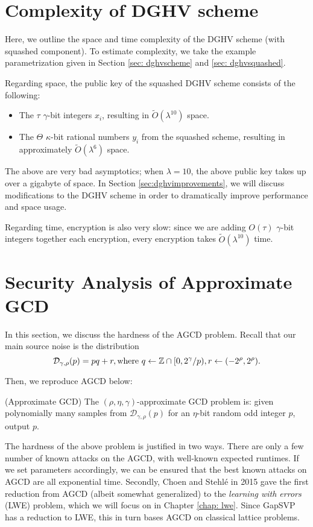 \section{Complexity of DGHV scheme}
\label{sec: dghvcomplexity}

Here, we outline the space and time complexity of the DGHV scheme (with squashed component). To estimate complexity, we take the example parametrization given in Section \ref{sec: dghvscheme} and \ref{sec: dghvsquashed}.

Regarding space, the public key of the squashed DGHV scheme consists of the following:
\begin{itemize}
    \item The $\tau$ $\gamma$-bit integers $x_i$, resulting in $\widetilde{O}(\lambda^{10})$ space.
    \item The $\Theta$ $\kappa$-bit rational numbers $y_i$ from the squashed scheme, resulting in approximately $\widetilde{O}(\lambda^6)$ space.
\end{itemize}

The above are very bad asymptotics; when $\lambda = 10$, the above public key takes up over a gigabyte of space. In Section \ref{sec:dghvimprovements}, we will discuss modifications to the DGHV scheme in order to dramatically improve performance and space usage.

Regarding time, encryption is also very slow: since we are adding $O(\tau)$ $\gamma$-bit integers together each encryption, every encryption takes $\widetilde{O}(\lambda^{10})$ time.

\section{Security Analysis of Approximate GCD} \label{sec:secagcd}
In this section, we discuss the hardness of the AGCD problem. Recall that our main source noise is the distribution
\[\mathcal{D}_{\gamma, \rho}(p) = pq+r, \text{where } q \leftarrow \mathbb{Z} \cap [0, 2^\gamma / p), r \leftarrow (-2^\rho, 2^\rho).\]

Then, we reproduce AGCD below:
    \begin{definition} (Approximate GCD)
    The $(\rho, \eta, \gamma)$-approximate GCD problem is: given polynomially many samples from $\mathcal{D}_{\gamma, \rho}(p)$ for an $\eta$-bit random odd integer $p$, output $p$.
    \end{definition}

    The hardness of the above problem is justified in two ways. There are only a few number of known attacks on the AGCD, with well-known expected runtimes. If we set parameters accordingly, we can be ensured that the best known attacks on AGCD are all exponential time. Secondly, Choen and Stehl\'e in 2015 gave the first reduction from AGCD (albeit somewhat generalized) to the \emph{learning with errors} (LWE) problem, which we will focus on in Chapter \ref{chap: lwe}. \cite{Cheon2015} Since GapSVP has a reduction to LWE, this in turn bases AGCD on classical lattice problems.

